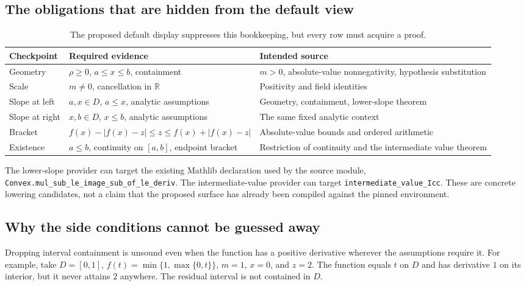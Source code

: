 \documentclass[11pt,a4paper]{article}
\newcommand{\code}[1]{\nolinkurl{#1}}
\newcommand{\R}{\mathbb R}
\theoremstyle{definition}
\theoremstyle{remark}
\numberwithin{equation}{section}
\begin{document}
\subsection{The obligations that are hidden from the default view}
\begin{table}[htbp]
\centering\small
\begin{tabularx}{\linewidth}{@{}P{.18\linewidth}YY@{}}
\toprule
Checkpoint & Required evidence & Intended source \\
\midrule
Geometry & $\rho\ge0$, $a\le x\le b$, containment & $m>0$, absolute-value nonnegativity, hypothesis substitution \\
Scale & $m\ne0$, cancellation in $\R$ & Positivity and field identities \\
Slope at left & $a,x\in D$, $a\le x$, analytic assumptions & Geometry, containment, lower-slope theorem \\
Slope at right & $x,b\in D$, $x\le b$, analytic assumptions & The same fixed analytic context \\
Bracket & $f(x)-|f(x)-z|\le z\le f(x)+|f(x)-z|$ & Absolute-value bounds and ordered arithmetic \\
Existence & $a\le b$, continuity on $[a,b]$, endpoint bracket & Restriction of continuity and the intermediate value theorem \\
\bottomrule
\end{tabularx}
\caption{The proposed default display suppresses this bookkeeping, but every row must acquire a proof.}
\label{tab:residual-obligations}
\end{table}
The lower-slope provider can target the existing Mathlib declaration used by the source module, \code{Convex.mul_sub_le_image_sub_of_le_deriv}. The intermediate-value provider can target \code{intermediate_value_Icc}. These are concrete lowering candidates, not a claim that the proposed surface has already been compiled against the pinned environment.\cite{p-mean}

\subsection{Why the side conditions cannot be guessed away}
Dropping interval containment is unsound even when the function has a positive derivative wherever the assumptions require it. For example, take $D=[0,1]$, $f(t)=\min\{1,\max\{0,t\}\}$, $m=1$, $x=0$, and $z=2$. The function equals $t$ on $D$ and has derivative $1$ on its interior, but it never attains $2$ anywhere. The residual interval is not contained in $D$.
\end{document}
